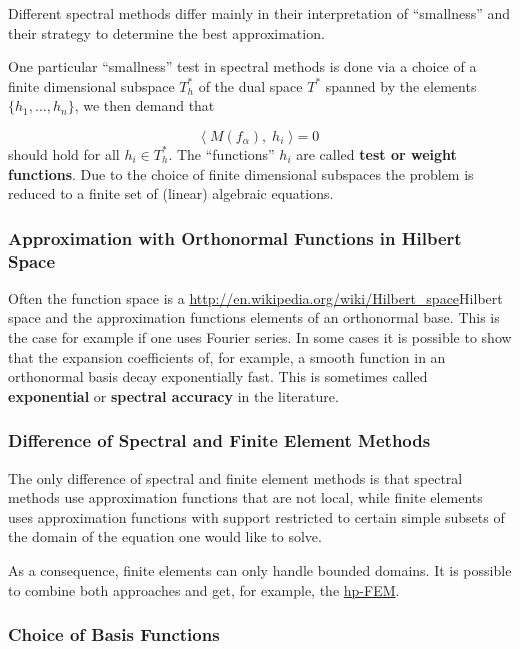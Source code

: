 \documentclass[preprint, 5p, 10pt]{elsarticle}
\theoremstyle{plain}
\begin{document}
Different spectral methods differ mainly in their interpretation of ``{}smallness''{} and their strategy to determine the best approximation.

One particular ``{}smallness''{} test in spectral methods is done via a choice of a finite dimensional subspace $T^*_h$ of the dual space $T^*$ spanned by the elements $\{h_1, ..., h_n \}$, we then demand that

\begin{displaymath}
\langle \; M(f_{\alpha}), \; h_i \; \rangle = 0
\end{displaymath}
should hold for all $h_i \in T^*_h$. The ``{}functions''{} $h_i$ are called \textbf{test or weight functions}. 
Due to the choice of finite dimensional subspaces the problem is reduced to a finite set of (linear) algebraic equations.

\subsubsection*{{Approximation with Orthonormal Functions in Hilbert Space}}

Often the function space is a \url{http://en.wikipedia.org/wiki/Hilbert_space}{Hilbert space} and the approximation functions elements of an orthonormal base. 
This is the case for example if one uses Fourier series. In some cases it is possible to show that the expansion coefficients of, 
for example, a smooth function in an orthonormal basis decay exponentially fast. This is sometimes called 
\textbf{exponential} or \textbf{spectral accuracy} in the literature.

\subsubsection*{{Difference of Spectral and Finite Element Methods}}

The only difference of spectral and finite element methods is that spectral methods use approximation functions that are not local, while finite elements uses approximation functions with support restricted to certain simple subsets of the domain of the equation one would like to solve.

As a consequence, finite elements can only handle bounded domains. It is possible to combine both approaches and get, for example, the \href{http://en.wikipedia.org/wiki/Hp-FEM}{hp-FEM}.

\subsubsection*{Choice of Basis Functions}
\end{document}
